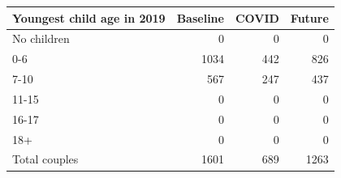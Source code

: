 
\begin{tabular}{lrrr}
\toprule
Youngest child age in 2019 & Baseline & COVID & Future\\
\midrule
No children & 0 & 0 & 0\\
0-6 & 1034 & 442 & 826\\
7-10 & 567 & 247 & 437\\
11-15 & 0 & 0 & 0\\
16-17 & 0 & 0 & 0\\
18+ & 0 & 0 & 0\\
Total couples & 1601 & 689 & 1263\\
\bottomrule
\end{tabular}
